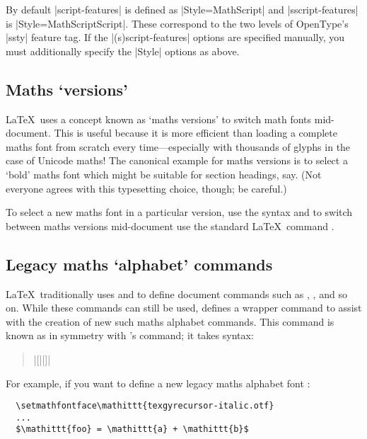 By default |script-features| is defined as |Style=MathScript| and |sscript-features| is |Style=MathScriptScript|.
These correspond to the two levels of OpenType's |ssty| feature tag.
If the |(s)script-features| options are specified manually, you must
additionally specify the |Style| options as above.


\subsection{Maths `versions'}

\LaTeX\ uses a concept known as `maths versions' to switch math fonts
mid-document.
This is useful because it is more efficient than loading a complete maths
font from scratch every time---especially with thousands of glyphs in the case of Unicode maths!
The canonical example for maths versions is to select a `bold' maths font
which might be suitable for section headings, say.
(Not everyone agrees with this typesetting choice, though; be careful.)

To select a new maths font in a particular version, use the syntax
and to switch between maths versions mid-document use the standard \LaTeX\ command
\cmd\mathversion{}.


\subsection{Legacy maths `alphabet' commands}

\LaTeX\ traditionally uses  and  to define document commands such as , , and so on.
While these commands can still be used,  defines a wrapper command to assist with the creation of new such maths alphabet commands.
This command is known as  in symmetry with 's  command; it takes syntax:
\begin{quote}
  \cmd\setmathfontface{}|[||]|

\end{quote}
For example, if you want to define a new legacy maths alphabet font :
\begin{verbatim}
  \setmathfontface\mathittt{texgyrecursor-italic.otf}
  ...
  $\mathittt{foo} = \mathittt{a} + \mathittt{b}$
\end{verbatim}



